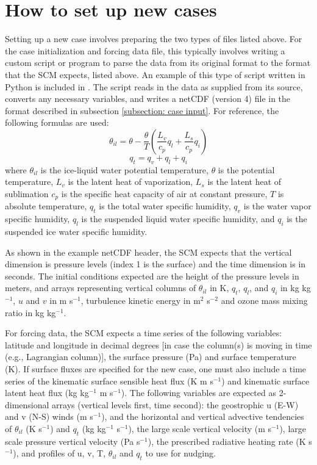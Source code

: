 \section{How to set up new cases}

Setting up a new case involves preparing the two types of files listed above. For the case initialization and forcing data file, this typically involves writing a custom script or program to parse the data from its original format to the format that the SCM expects, listed above. An example of this type of script written in Python is included in . The script reads in the data as supplied from its source, converts any necessary variables, and writes a netCDF (version 4) file in the format described in subsection \ref{subsection: case input}. For reference, the following formulas are used:
\begin{equation}
\theta_{il} = \theta - \frac{\theta}{T}\left(\frac{L_v}{c_p}q_l + \frac{L_s}{c_p}q_i\right)
\end{equation}
\begin{equation}
q_t = q_v + q_l + q_i
\end{equation}
where $\theta_{il}$ is the ice-liquid water potential temperature, $\theta$ is the potential temperature, $L_v$ is the latent heat of vaporization, $L_s$ is the latent heat of sublimation $c_p$ is the specific heat capacity of air at constant pressure, $T$ is absolute temperature, $q_t$ is the total water specific humidity, $q_v$ is the water vapor specific humidity, $q_l$ is the suspended liquid water specific humidity, and $q_i$ is the suspended ice water specific humidity.

As shown in the example netCDF header, the SCM expects that the vertical dimension is pressure levels (index 1 is the surface) and the time dimension is in seconds. The initial conditions expected are the height of the pressure levels in meters, and arrays representing vertical columns of $\theta_{il}$ in K, $q_t$, $q_l$, and $q_i$ in kg kg$^{-1}$, $u$ and $v$ in m s$^{-1}$, turbulence kinetic energy in m$^2$ s$^{-2}$ and ozone mass mixing ratio in kg kg$^{-1}$.

For forcing data, the SCM expects a time series of the following variables: latitude and longitude in decimal degrees [in case the column(s) is moving in time (e.g., Lagrangian column)], the surface pressure (Pa) and surface temperature (K). If surface fluxes are specified for the new case, one must also include a time series of the kinematic surface sensible heat flux (K m s$^{-1}$) and kinematic surface latent heat flux (kg kg$^{-1}$ m s$^{-1}$). The following variables are expected as 2-dimensional arrays (vertical levels first, time second):  the geostrophic u (E-W) and v (N-S) winds (m s$^{-1}$), and the horizontal and vertical advective tendencies of $\theta_{il}$ (K s$^{-1}$) and $q_t$ (kg kg$^{-1}$ s$^{-1}$), the large scale vertical velocity (m s$^{-1}$), large scale pressure vertical velocity (Pa s$^{-1}$), the prescribed radiative heating rate (K s$^{-1}$), and profiles of u, v, T, $\theta_{il}$ and $q_t$ to use for nudging.

